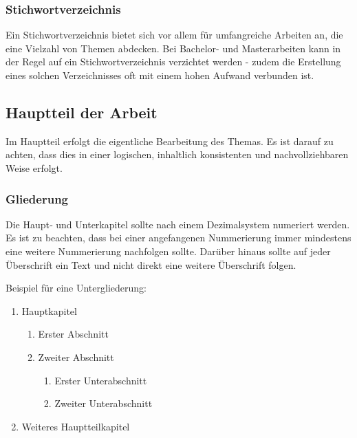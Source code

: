 \subsubsection{Stichwortverzeichnis}\label{sec:structure:tables:index}
%
Ein Stichwortverzeichnis bietet sich vor allem für umfangreiche Arbeiten an, die eine Vielzahl von Themen abdecken. Bei Bachelor- und Masterarbeiten kann in der Regel auf ein Stichwortverzeichnis verzichtet werden - zudem die Erstellung eines solchen Verzeichnisses oft mit einem hohen Aufwand verbunden ist.

\subsection{Hauptteil der Arbeit}\label{sec:structure:main}
%
Im Hauptteil erfolgt die eigentliche Bearbeitung des Themas. Es ist darauf zu achten, dass dies in einer logischen, inhaltlich konsistenten und nachvollziehbaren Weise erfolgt.

\subsubsection{Gliederung}\label{sec:structure:main:structure}
%
Die Haupt‑ und Unterkapitel sollte nach einem Dezimalsystem numeriert werden. Es ist zu beachten, dass bei einer angefangenen Nummerierung immer mindestens eine weitere Nummerierung nachfolgen sollte. Darüber hinaus sollte auf jeder Überschrift ein Text  und nicht direkt eine weitere Überschrift folgen.

Beispiel für eine Untergliederung:
%
\begin{enumerate}[label=\arabic*]
  \item Hauptkapitel
  \begin{enumerate}[label=\arabic{enumi}.\arabic*]
    \item Erster Abschnitt
    \item Zweiter Abschnitt
    \begin{enumerate}[label=\arabic{enumi}.\arabic{enumii}.\arabic*]
       \item Erster Unterabschnitt
       \item Zweiter Unterabschnitt
    \end{enumerate}
  \end{enumerate}
  \item Weiteres Hauptteilkapitel
\end{enumerate}
\bigskip


